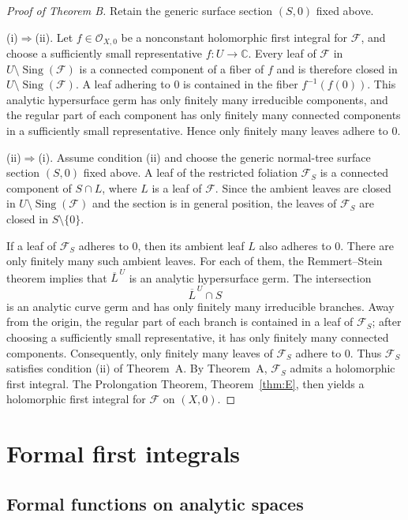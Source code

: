 \documentclass[11pt,twoside]{amsart}
\newcommand{\C}{\mathbb C}
\newcommand{\OO}{\mathcal O}
\newcommand{\F}{\mathcal F}
\DeclareMathOperator{\Sing}{Sing}
\theoremstyle{definition}
\begin{document}
\begin{proof}[Proof of Theorem B]
Retain the generic surface section $(S,0)$ fixed above.

\noindent\textup{(i)$\Rightarrow$(ii).}
Let $f\in\OO_{X,0}$ be a nonconstant holomorphic first integral for
$\F$, and choose a sufficiently small representative
$f\colon U\to\C$. Every leaf of $\F$ in
$U\setminus\Sing(\F)$ is a connected component of a fiber of $f$ and
is therefore closed in $U\setminus\Sing(\F)$. A leaf adhering to $0$
is contained in the fiber $f^{-1}(f(0))$. This analytic hypersurface
germ has only finitely many irreducible components, and the regular
part of each component has only finitely many connected components in
a sufficiently small representative. Hence only finitely many leaves
adhere to $0$.

\medskip
\noindent\textup{(ii)$\Rightarrow$(i).}
Assume condition \textup{(ii)} and choose the generic normal-tree surface
section $(S,0)$ fixed above. A leaf of the restricted foliation
$\F_S$ is a connected component of $S\cap L$, where $L$ is a leaf of
$\F$. Since the ambient leaves are closed in
$U\setminus\Sing(\F)$ and the section is in general position, the
leaves of $\F_S$ are closed in $S\setminus\{0\}$.

If a leaf of $\F_S$ adheres to $0$, then its ambient leaf $L$ also
adheres to $0$. There are only finitely many such ambient leaves. For
each of them, the Remmert--Stein theorem implies that
$\overline L^{\,U}$ is an analytic hypersurface germ. The intersection
\[
\overline L^{\,U}\cap S
\]
is an analytic curve germ and has only finitely many irreducible
branches. Away from the origin, the regular part of each branch is
contained in a leaf of $\F_S$; after choosing a sufficiently small
representative, it has only finitely many connected components.
Consequently, only finitely many leaves of $\F_S$ adhere to $0$. Thus
$\F_S$ satisfies condition \textup{(ii)} of Theorem~A.
By Theorem~A, $\F_S$ admits a holomorphic first integral. The
Prolongation Theorem, Theorem~\ref{thm:E}, then yields a holomorphic first integral for
$\F$ on $(X,0)$.
\end{proof}
\section{Formal first integrals}\label{sec:formal}

\subsection{Formal functions on analytic spaces}
\end{document}
